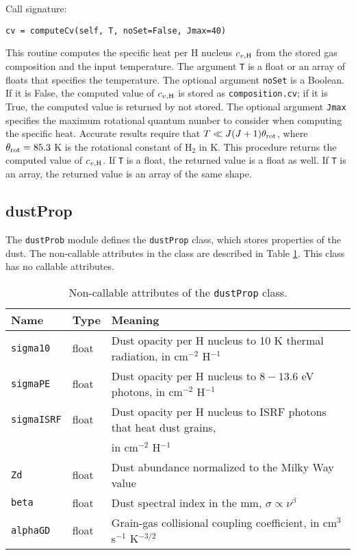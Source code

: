 \documentclass[12pt]{article}
\begin{document}
Call signature:

\begin{verbatim}
cv = computeCv(self, T, noSet=False, Jmax=40)
\end{verbatim}

This routine computes the specific heat per H nucleus $c_{v,\rm H}$ from the stored gas composition and the input temperature. The argument \verb=T= is a float or an array of floats that specifies the temperature. The optional argument \verb=noSet= is a Boolean. If it is False, the computed value of $c_{v,\rm H}$ is stored as \verb=composition.cv=; if it is True, the computed value is returned by not stored. The optional argument \verb=Jmax= specifies the maximum rotational quantum number to consider when computing the specific heat. Accurate results require that $T \ll J(J+1) \theta_{\rm rot}$, where $\theta_{\rm rot} = 85.3$ K is the rotational constant of H$_2$ in K. This procedure returns the computed value of $c_{v,\rm H}$. If \verb=T= is a float, the returned value is a float as well. If \verb=T= is an array, the returned value is an array of the same shape.


\clearpage

\subsection{dustProp}

The \verb=dustProb= module defines the \verb=dustProp= class, which stores properties of the dust. The non-callable attributes in the class are described in Table \ref{tab:dust}. This class has no callable attributes.

\begin{table}
\begin{center}
\begin{tabular}{lll}
\hline\hline
Name & Type & Meaning \\
\hline\hline
\texttt{sigma10} & float & Dust opacity per H nucleus to 10 K thermal radiation, in cm$^{-2}$ H$^{-1}$ \\
\texttt{sigmaPE} & float & Dust opacity per H nucleus to $8-13.6$ eV photons, in cm$^{-2}$ H$^{-1}$ \\
\texttt{sigmaISRF} & float & Dust opacity per H nucleus to ISRF photons that heat dust grains, \\
& & \quad in cm$^{-2}$ H$^{-1}$ \\
\texttt{Zd} & float & Dust abundance normalized to the Milky Way value \\
\texttt{beta} & float & Dust spectral index in the mm, $\sigma\propto \nu^\beta$ \\
\texttt{alphaGD} & float & Grain-gas collisional coupling coefficient, in cm$^3$ s$^{-1}$ K$^{-3/2}$ \\
\hline
\end{tabular}
\caption{
\label{tab:dust}
Non-callable attributes of the \texttt{dustProp} class.
}
\end{center}
\end{table}
\end{document}
